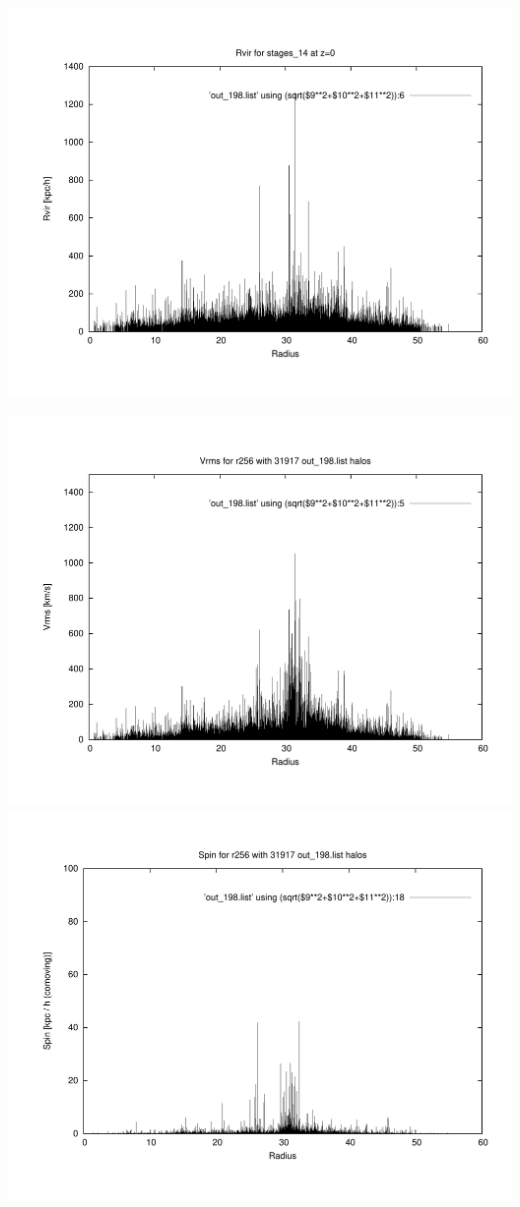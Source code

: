 \includegraphics[scale=0.3]{stages_14/plot_rvir_z0.pdf}

\includegraphics[scale=0.3]{stages_14/plot_Vrms_out_198.pdf}
\includegraphics[scale=0.3]{stages_14/plot_spin_out_198.pdf}

